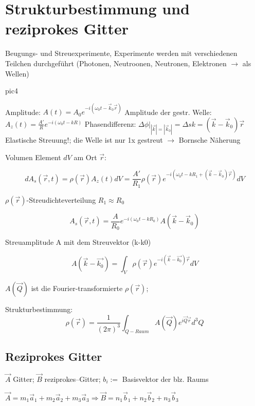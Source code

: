 



\tableofcontents
\setcounter{chapter}{2}
\chapter{Strukturbestimmung und reziprokes Gitter}


Beugungs- und Streuexperimente, Experimente werden mit verschiedenen Teilchen
durchgeführt (Photonen, Neutroonen, Neutronen, Elektronen \(\rightarrow\) als
Wellen)

pic4

Amplitude: \(A(t)=A_0e^{-i(\omega_0t-\vec k_0\vec r)}\)
Amplitude der gestr. Welle: \( A_z(t)=\frac {A'} R e^{-i(\omega_0t-kR)}\)
Phasendifferenz: \(\left. \Delta\phi \right|_{|\vec k|=|\vec k_0|}=\Delta
s k= (\vec k - \vec k_0)\vec r\)
Elastische Streuung!; die Welle ist nur 1x gestreut \(\rightarrow\) Bornsche
Näherung

Volumen Element \(dV\) am Ort \(\vec r\):

\[dA_s(\vec r,t)=\rho(\vec r)A_z(t)dV=\frac {A'}{R_1}\rho(\vec
r)e^{-i(\omega_0t-kR_1+(\vec k-\vec k_0)\vec r)}dV\] 

\(\rho(\vec r)\)-Streudichteverteilung \(R_1\approx R_0\)

\[A_s(\vec r,t)=\frac {A}{R_0}e^{-i(\omega_0t-kR_0)}A(\vec k-\vec k_0)\]

Streuamplitude A mit dem Streuvektor (k-k0)

\[A(\vec k - \vec {k_0}) = \int_V \rho(\vec r) e^{-i(\vec k -\vec {k_0})\vec r}dV\]

\(A(\vec Q)\) ist die Fourier-transformierte \(\rho(\vec r)\);

Strukturbestimmung:
\[\rho(\vec r) = \frac 1 {(2\pi)^3}\int_{Q-Raum}A(\vec Q) e^{i\vec Q \vec r}
d^3Q\]

\section{Reziprokes Gitter}

\(\vec A\) Gitter;  \(\vec B\) reziprokes--Gitter; \(b_i:=\) Basisvektor der blz.  Raums 

\(\vec A= m_1\vec a_1+m_2\vec a_2 + m_3\vec a_3 \Rightarrow \vec B = n_1\vec b_1+n_2\vec b_2 + n_3\vec b_3 \)


